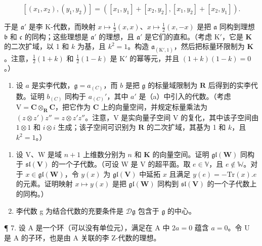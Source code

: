 \[
[ (x _ {1}, x _ {2}), (y _ {1}, y _ {2}) ] = ([ x _ {1}, y _ {1} ] + [ x _ {2}, y _ {2} ], [ x _ {1}, y _ {2} ] + [ x _ {2}, y _ {1} ]).
\]

    于是 \(\mathfrak{a}'\) 是李 K-代数，而映射 \(x\mapsto \frac{1}{2} (x,x)\)、\(x\mapsto \frac{1}{2} (x, - x)\) 是把 \(\mathfrak{a}\) 同构到理想 \(\mathfrak{b}\) 和 \(\mathfrak{c}\) 的同构；这些理想是 \(\mathfrak{a}'\) 的理想，且 \(\mathfrak{a}'\) 是它们的直和。（考虑 \(\mathrm{K}'\)，它是 \(\mathbf{K}\) 的二次扩域，以 1 和 \(k\) 为基，且 \(k^2 = 1\)。构造 \(\mathfrak{a}_{(\mathrm{K}',1)}\)，然后把标量环限制为 \(\mathbf{K}\)。注意，\(\frac{1}{2} (1 + k)\) 和 \(\frac{1}{2}(1 - k)\) 是 \(\mathrm{K}'\) 的幂等元，并且 \((1 + k)(1 - k) = 0\)。）

\begin{enumerate}
\def\labelenumi{(\alph{enumi})}
\setcounter{enumi}{1}
\tightlist
\item
    设 \(a\) 是实李代数，\(\mathfrak{g} = a_{(C)}\)，而 \(b\) 是把 \(\mathfrak{g}\) 的标量域限制为 \(\mathbf{R}\) 后得到的实李代数。证明 \(b_{(C)}\) 同构于 \(a_{(C)}'\)，其中 \(a'\) 是（a）中引入的代数。（考虑 \(\mathrm{V} = \mathbf{C} \otimes_{\mathbf{R}} \mathbf{C}\)，把它作为 \(\mathbf{C}\) 上的向量空间，并规定标量乘法为 \((z \otimes z')z'' = z \otimes z'z''\)。注意，\(\mathrm{V}\) 是实向量子空间 \(\mathrm{V}\) 的复化，其中该子空间由 \(1 \otimes 1\) 和 \(i \otimes i\) 生成；该子空间可识别为 \(\mathbf{R}\) 的二次扩域，其基为 1 和 \(k\)，且 \(k^2 = 1\)。）
\end{enumerate}

\begin{enumerate}
\def\labelenumi{\arabic{enumi}.}
\setcounter{enumi}{4}
\item
  设 \(\mathrm{V}\)、\(\mathrm{W}\) 是域 \(n + 1\) 上维数分别为 \(n\) 和 \(\mathbf{K}\) 的向量空间。证明 \(\mathfrak{gl}(\mathbf{W})\) 同构于 \(\mathfrak{sl}(\mathbf{V})\) 的一个子代数。（可设 W 是 \(\mathrm{V}\) 的超平面。取 \(e \in \mathbb{V}\)，且 \(e \notin \mathbb{W}\)。对于 \(x \in \mathfrak{gl}(\mathbf{W})\)，令 \(y(x)\) 为 \(\mathfrak{gl}(\mathbf{V})\) 中延拓 \(x\) 且满足 \(y(e) = -\mathrm{Tr}(x).e\) 的元素。证明映射 \(x \mapsto y(x)\) 是把 \(\mathfrak{gl}(\mathbf{W})\) 同构到 \(\mathfrak{sl}(\mathbf{V})\) 的一个子代数上的同构。）
\item
  李代数 g 为结合代数的充要条件是 \(\mathcal{D}\mathfrak{g}\) 包含于 \(\mathfrak{g}\) 的中心。
\end{enumerate}

¶ 7. 设 A 是一个环（可以没有单位元），满足在 A 中 \(2a = 0\) 蕴含 \(a = 0\)。令 U 是 A 的子环，也是由 A 关联的李 Z-代数的理想。

